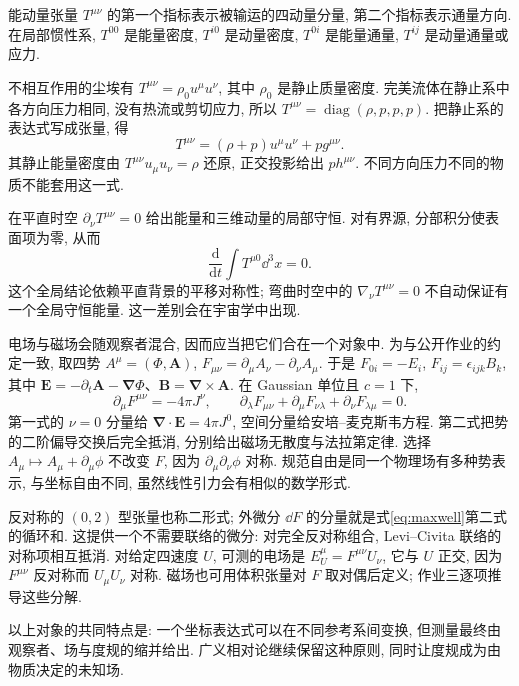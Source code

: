 \begin{definition}
能动量张量 $T^{\mu\nu}$ 的第一个指标表示被输运的四动量分量, 第二个指标表示通量方向. 在局部惯性系, $T^{00}$ 是能量密度, $T^{i0}$ 是动量密度, $T^{0i}$ 是能量通量, $T^{ij}$ 是动量通量或应力.
\end{definition}
不相互作用的尘埃有 $T^{\mu\nu}=\rho_0u^\mu u^\nu$, 其中 $\rho_0$ 是静止质量密度. 完美流体在静止系中各方向压力相同, 没有热流或剪切应力, 所以 $T^{\mu\nu}=\operatorname{diag}(\rho,p,p,p)$. 把静止系的表达式写成张量, 得
\begin{equation}\label{eq:perfect-fluid}
T^{\mu\nu}=(\rho+p)u^\mu u^\nu+p g^{\mu\nu}.
\end{equation}
其静止能量密度由 $T^{\mu\nu}u_\mu u_\nu=\rho$ 还原, 正交投影给出 $p h^{\mu\nu}$. 不同方向压力不同的物质不能套用这一式.

在平直时空 $\partial_\nu T^{\mu\nu}=0$ 给出能量和三维动量的局部守恒. 对有界源, 分部积分使表面项为零, 从而
\[
\frac{\mathrm d}{\mathrm dt}\int T^{\mu0}\dd^3x=0.
\]
这个全局结论依赖平直背景的平移对称性; 弯曲时空中的 $\nabla_\nu T^{\mu\nu}=0$ 不自动保证有一个全局守恒能量. 这一差别会在宇宙学中出现.

电场与磁场会随观察者混合, 因而应当把它们合在一个对象中. 为与公开作业的约定一致, 取四势 $A^\mu=(\Phi,\boldsymbol A)$,
$F_{\mu\nu}=\partial_\mu A_\nu-\partial_\nu A_\mu$. 于是 $F_{0i}=-E_i$, $F_{ij}=\epsilon_{ijk}B_k$, 其中 $\boldsymbol E=-\partial_t\boldsymbol A-\boldsymbol\nabla\Phi$、$\boldsymbol B=\boldsymbol\nabla\times\boldsymbol A$. 在 Gaussian 单位且 $c=1$ 下,
\begin{equation}\label{eq:maxwell}
\partial_\mu F^{\mu\nu}=-4\pi J^\nu,\qquad
\partial_\lambda F_{\mu\nu}+\partial_\mu F_{\nu\lambda}+\partial_\nu F_{\lambda\mu}=0.
\end{equation}
第一式的 $\nu=0$ 分量给 $\boldsymbol\nabla\cdot\boldsymbol E=4\pi J^0$, 空间分量给安培--麦克斯韦方程. 第二式把势的二阶偏导交换后完全抵消, 分别给出磁场无散度与法拉第定律. 选择 $A_\mu\mapsto A_\mu+\partial_\mu\phi$ 不改变 $F$, 因为 $\partial_\mu\partial_\nu\phi$ 对称. 规范自由是同一个物理场有多种势表示, 与坐标自由不同, 虽然线性引力会有相似的数学形式.

反对称的 $(0,2)$ 型张量也称二形式; 外微分 $\dd F$ 的分量就是式\eqref{eq:maxwell}第二式的循环和. 这提供一个不需要联络的微分: 对完全反对称组合, Levi--Civita 联络的对称项相互抵消. 对给定四速度 $U$, 可测的电场是 $E_U^\mu=F^{\mu\nu}U_\nu$, 它与 $U$ 正交, 因为 $F^{\mu\nu}$ 反对称而 $U_\mu U_\nu$ 对称. 磁场也可用体积张量对 $F$ 取对偶后定义; 作业三逐项推导这些分解.

以上对象的共同特点是: 一个坐标表达式可以在不同参考系间变换, 但测量最终由观察者、场与度规的缩并给出. 广义相对论继续保留这种原则, 同时让度规成为由物质决定的未知场.
